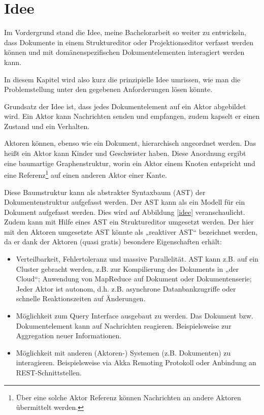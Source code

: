  
\section{Idee}\label{}
 
Im Vordergrund stand die Idee, meine Bachelorarbeit so weiter zu entwickeln, dass Dokumente in einem Struktureditor oder Projektionseditor verfasst werden können und mit domänenspezifischen Dokumentelementen interagiert werden kann.

 
In diesem Kapitel wird also kurz die prinzipielle Idee umrissen, wie man die Problemstellung unter den gegebenen Anforderungen lösen könnte.

 
Grundsatz der Idee ist, dass jedes Dokumentelement auf ein Aktor abgebildet wird. Ein Aktor kann Nachrichten senden und empfangen, zudem kapselt er einen Zustand und ein Verhalten.

 
Aktoren können, ebenso wie ein Dokument, hierarchisch angeordnet werden. Das heißt ein Aktor kann Kinder und Geschwister haben. Diese Anordnung ergibt eine baumartige Graphenstruktur, worin ein Aktor einem Knoten entspricht und eine Referenz\footnote{Über eine solche Aktor Referenz können Nachrichten an andere Aktoren übermittelt werden.} auf einen anderen Aktor einer Kante.

 
Diese Baumstruktur kann als abstrakter Syntaxbaum (AST) der Dokumentenstruktur aufgefasst werden. Der AST kann als ein Modell für ein Dokument aufgefasst werden. Dies wird auf Abbildung \ref{idee} veranschaulicht. Zudem kann mit Hilfe eines AST ein Struktureditor umgesetzt werden. Der hier mit den Aktoren umgesetzte AST könnte als „reaktiver AST“ bezeichnet werden, da er dank der Aktoren (quasi gratis) besondere Eigenschaften erhält:

 
\begin{itemize}

\item Verteilbarkeit, Fehlertoleranz und massive Parallelität. AST kann z.B. auf ein Cluster gebracht werden, z.B. zur Kompilierung des Dokuments in „der Cloud“; Anwendung von MapReduce auf Dokument oder Dokumentenserie; Jeder Aktor ist autonom, d.h. z.B. asynchrone Datanbankzugriffe oder schnelle Reaktionszeiten auf Änderungen.
\item Möglichkeit zum Query Interface ausgebaut zu werden. Das Dokument bzw. Dokumentelement kann auf Nachrichten reagieren. Beispielsweise zur Aggregation neuer Informationen.
\item Möglichkeit mit anderen (Aktoren-) Systemen (z.B. Dokumenten) zu interagieren. Beispielsweise via Akka Remoting Protokoll oder Anbindung an REST-Schnittstellen.
\end{itemize}
 
